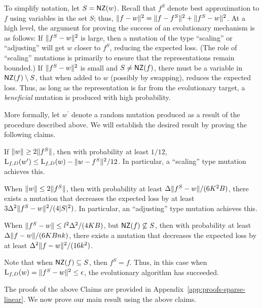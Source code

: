 To simplify notation, let $S = \mathsf{NZ}(w)$. Recall that $f^S$ denote best
approximation to $f$ using variables in the set $S$; thus, $\Vert f - w \Vert^2 =
\Vert f - f^S \Vert^2 + \Vert f^S - w \Vert^2$. At a high level, the argument for
proving the success of an evolutionary mechanism is as follows: If
$\Vert f^S - w \Vert^2$ is large, then a mutation of the type ``scaling'' or
``adjusting'' will get $w$ closer to $f^S$, reducing the expected loss. (The
role of ``scaling'' mutations is primarily to ensure that the representations
remain bounded.) If $\Vert f^S - w \Vert^2$ is small and $S \neq \mathsf{NZ}(f)$, there
must be a variable in $\mathsf{NZ}(f) \setminus S$, that when added to $w$ (possibly by
swapping), reduces the expected loss. Thus, as long as the representation is far
from the evolutionary target, a \emph{beneficial} mutation is produced with high
probability.

More formally, let $w^\prime$ denote a random mutation produced as a result of
the procedure described above.  We will establish the desired result by proving
the following claims.
\begin{claim} \label{claim:apple} If $\Vert w \Vert \geq 2 \Vert f^S \Vert$, then
with probability at least $1/12$, $\mathrm{L}_{f, D}(w^\prime) \leq \mathrm{L}_{f, D}(w) -
\Vert w - f^S \Vert^2/12$. In particular, a ``scaling'' type mutation achieves
this. \end{claim}
\begin{claim} \label{claim:banana} When $\Vert w \Vert \leq 2 \Vert f^S \Vert$,
then with probability at least $\Delta \Vert f^S - w \Vert/(6K^2 B)$, there
exists a mutation that decreases the expected loss by at least $3
\Delta^2\Vert f^S - w \Vert^2/(4|S|^2)$. In particular, an ``adjusting'' type
mutation achieves this. \end{claim}
\begin{claim} \label{claim:cantaloupe} When $\Vert f^S - w \Vert \leq
l^2\Delta^2/(4KB)$, but $\mathsf{NZ}(f) \not\subseteq S$, then with probability
at least $\Delta \Vert f - w \Vert/(6KBnk)$, there exists a mutation that
decreases the expected loss by at least $\Delta^2 \Vert f-w \Vert^2/(16k^2)$.
\end{claim}

Note that when $\mathsf{NZ}(f) \subseteq S$, then $f^S = f$. Thus, in this case
when $\mathrm{L}_{f, D}(w) = \Vert f^S - w \Vert^2 \leq \epsilon$, the evolutionary
algorithm has succeeded. \medskip 

The proofs of the above Claims are provided in
Appendix~\ref{app:proofs-sparse-linear}. We now prove our main result using the
above claims.
% 

